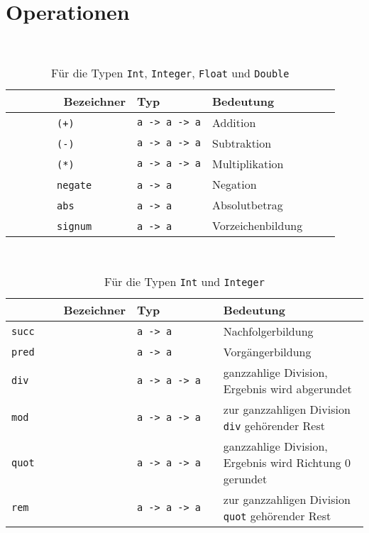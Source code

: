 \documentclass[
  10pt,                   %
  DIV12,
  german,                 %
  oneside,                %
  parskip=half,           %
  headings=normal,        %
  captions=tableheading,  %
]{scrartcl}
\begin{document}
\section{Operationen}
\begin{table}[H]
	\centering
    \begin{tabular}{lll} %
        Bezeichner & Typ	& Bedeutung\\ \hline
        \lstinline|(+)|        & \lstinline|a -> a -> a| & Addition          \\ 
        \lstinline|(-)|        & \lstinline|a -> a -> a| & Subtraktion       \\ 
        \lstinline|(*)|        & \lstinline|a -> a -> a| & Multiplikation \\ 
        \lstinline|negate|     & \lstinline|a -> a|      & Negation        \\ 
        \lstinline|abs|        & \lstinline|a -> a|      & Absolutbetrag     \\ 
        \lstinline|signum|     & \lstinline|a -> a|      & Vorzeichenbildung %
    \end{tabular}	
\caption{Für die Typen \lstinline|Int|, \lstinline|Integer|, \lstinline|Float| und \lstinline|Double|}
\end{table}
\begin{table}[H]
	\centering
    \begin{tabular}{lll} %
        Bezeichner & Typ         & Bedeutung         \\ \hline
		\lstinline|succ| 	& \lstinline|a -> a| & Nachfolgerbildung \\
		\lstinline|pred| 	& \lstinline|a -> a| & Vorgängerbildung\\
		\lstinline|div| 	& \lstinline|a -> a -> a| & ganzzahlige Division, Ergebnis wird abgerundet\\
		\lstinline|mod| 	& \lstinline|a -> a -> a| & zur ganzzahligen Division \lstinline|div| gehörender Rest\\
		\lstinline|quot| 	& \lstinline|a -> a -> a| & ganzzahlige Division, Ergebnis wird Richtung 0 gerundet\\
		\lstinline|rem| 	& \lstinline|a -> a -> a| & zur ganzzahligen Division \lstinline|quot| gehörender Rest %
    \end{tabular}	
\caption{Für die Typen \lstinline|Int| und \lstinline|Integer|}
\end{table}
\end{document}
